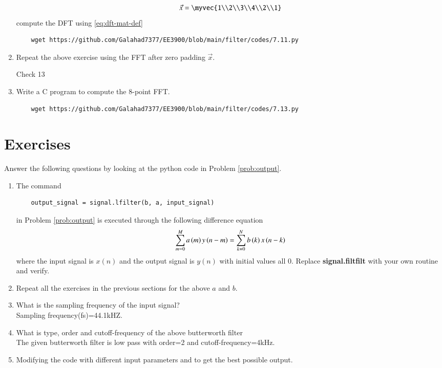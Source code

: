 \documentclass[journal,12pt,twocolumn]{IEEEtran}
\renewcommand\thesection{\arabic{section}}
\begin{document}
\begin{enumerate}[label=\thesection.\arabic*]
    \begin{align}
	    \vec{x} = \myvec{1\\2\\3\\4\\2\\1}
        \label{eq:equation1}
    \end{align}
    compute the DFT  
		using 
	    \eqref{eq:dft-mat-def}
     
\solution
\begin{lstlisting}
    wget https://github.com/Galahad7377/EE3900/blob/main/filter/codes/7.11.py
\end{lstlisting}
    \item Repeat the above exercise using the FFT
	    after zero padding $\vec{x}$.

\solution Check 13
\item Write a C program to compute the 8-point FFT. 

\solution
\begin{lstlisting}
    wget https://github.com/Galahad7377/EE3900/blob/main/filter/codes/7.13.py
\end{lstlisting}
 \end{enumerate}
\section{Exercises}
Answer the following questions by looking at the python code in Problem \ref{prob:output}.
\begin{enumerate}[label=\thesection.\arabic*]
\item
The command
\begin{lstlisting}
	output_signal = signal.lfilter(b, a, input_signal)
	\end{lstlisting}
in Problem \ref{prob:output} is executed through the following difference equation
\begin{equation}
\label{eq:iir_filter_gen}
 \sum _{m=0}^{M}a\left(m\right)y\left(n-m\right)=\sum _{k=0}^{N}b\left(k\right)x\left(n-k\right)
\end{equation}
%
where the input signal is $x(n)$ and the output signal is $y(n)$ with initial values all 0. Replace
\textbf{signal.filtfilt} with your own routine and verify.
%
\item Repeat all the exercises in the previous sections for the above $a$ and $b$.

\item What is the sampling frequency of the input signal?
\\
\solution
Sampling frequency(fs)=44.1kHZ.
\item
What is type, order and  cutoff-frequency of the above butterworth filter
\\
\solution
The given butterworth filter is low pass with order=2 and cutoff-frequency=4kHz.
%
\item
Modifying the code with different input parameters and to get the best possible output.
%
\end{enumerate}
\end{document}
